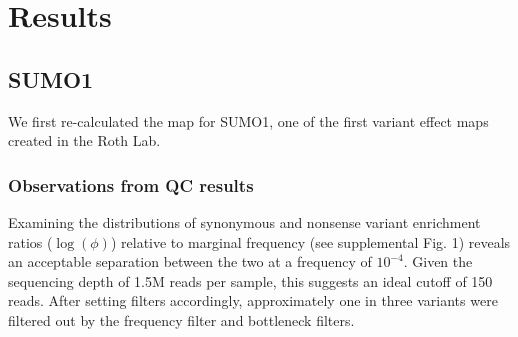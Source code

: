 \documentclass{article}
\begin{document}

\section{Results}
\subsection{SUMO1}
We first re-calculated the map for SUMO1, one of the first variant effect maps created in the Roth Lab\cite{weile_framework_2017}.
\subsubsection{Observations from QC results}


Examining the distributions of synonymous and nonsense variant enrichment ratios ($\log(\phi)$) relative to marginal frequency (see supplemental Fig. 1) reveals an acceptable separation between the two at a frequency of $10^{-4}$. Given the sequencing depth of 1.5M reads per sample, this suggests an ideal cutoff of 150 reads. After setting filters accordingly, approximately one in three variants were filtered out by the frequency filter and bottleneck filters.

\end{document}
